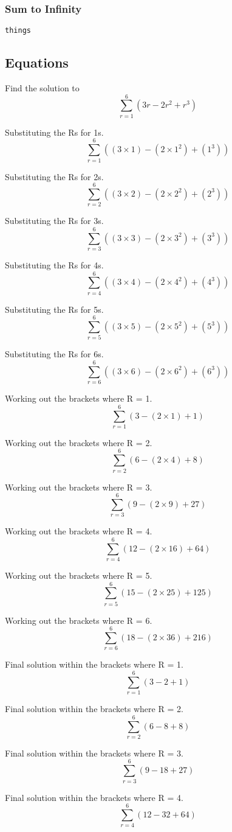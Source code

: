 \documentclass[a4paper,12pt]{article}
\begin{document}
\subsubsection{Sum to Infinity}
\texttt{things}

\newpage

\subsection{Equations}
Find the solution to
$$\sum_{r=1}^6 (3r - 2r^2 + r^3)$$

Substituting the Rs for 1s.
$$\sum_{r=1}^6 ((3 \times 1) - (2 \times 1^2) + (1^3))$$

Substituting the Rs for 2s.
$$\sum_{r=2}^6 ((3 \times 2) - (2 \times 2^2) + (2^3))$$

Substituting the Rs for 3s.
$$\sum_{r=3}^6 ((3 \times 3) - (2 \times 3^2) + (3^3))$$

Substituting the Rs for 4s.
$$\sum_{r=4}^6 ((3 \times 4) - (2 \times 4^2) + (4^3))$$

Substituting the Rs for 5s.
$$\sum_{r=5}^6 ((3 \times 5) - (2 \times 5^2) + (5^3))$$

Substituting the Rs for 6s.
$$\sum_{r=6}^6 ((3 \times 6) - (2 \times 6^2) + (6^3))$$

\newpage

Working out the brackets where R = 1.
$$\sum^6_{r=1} (3 - (2 \times 1) + 1)$$

Working out the brackets where R = 2.
$$\sum^6_{r=2} (6 - (2 \times 4) + 8)$$

Working out the brackets where R = 3.
$$\sum^6_{r=3} (9 - (2 \times 9) + 27)$$

Working out the brackets where R = 4.
$$\sum^6_{r=4} (12 - (2 \times 16) + 64)$$

Working out the brackets where R = 5.
$$\sum^6_{r=5} (15 - (2 \times 25) + 125)$$

Working out the brackets where R = 6.
$$\sum^6_{r=6} (18 - (2 \times 36) + 216)$$

\newpage

Final solution within the brackets where R = 1.
$$\sum^6_{r=1} (3 - 2 + 1)$$

Final solution within the brackets where R = 2.
$$\sum^6_{r=2} (6 - 8 + 8)$$

Final solution within the brackets where R = 3.
$$\sum^6_{r=3} (9 - 18 + 27)$$

Final solution within the brackets where R = 4.
$$\sum^6_{r=4} (12 - 32 + 64)$$
\end{document}
